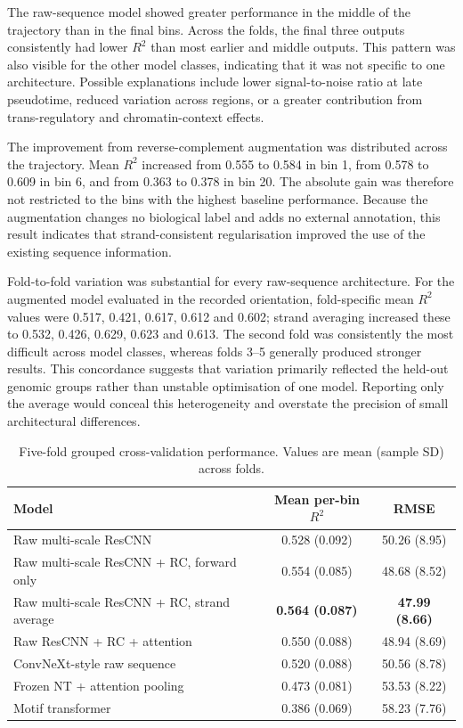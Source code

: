 \documentclass[a4paper,12pt]{article}
\begin{document}
The raw-sequence model showed greater performance in the middle of the trajectory than in the final bins. Across the folds, the final three outputs consistently had lower $R^2$ than most earlier and middle outputs. This pattern was also visible for the other model classes, indicating that it was not specific to one architecture. Possible explanations include lower signal-to-noise ratio at late pseudotime, reduced variation across regions, or a greater contribution from trans-regulatory and chromatin-context effects.

The improvement from reverse-complement augmentation was distributed across the trajectory. Mean $R^2$ increased from 0.555 to 0.584 in bin 1, from 0.578 to 0.609 in bin 6, and from 0.363 to 0.378 in bin 20. The absolute gain was therefore not restricted to the bins with the highest baseline performance. Because the augmentation changes no biological label and adds no external annotation, this result indicates that strand-consistent regularisation improved the use of the existing sequence information.

Fold-to-fold variation was substantial for every raw-sequence architecture. For the augmented model evaluated in the recorded orientation, fold-specific mean $R^2$ values were 0.517, 0.421, 0.617, 0.612 and 0.602; strand averaging increased these to 0.532, 0.426, 0.629, 0.623 and 0.613. The second fold was consistently the most difficult across model classes, whereas folds 3--5 generally produced stronger results. This concordance suggests that variation primarily reflected the held-out genomic groups rather than unstable optimisation of one model. Reporting only the average would conceal this heterogeneity and overstate the precision of small architectural differences.

\begin{table}[htb]
\centering
\caption{Five-fold grouped cross-validation performance. Values are mean (sample SD) across folds.}
\label{tab:cv}
\begin{tabular}{lcc}
\toprule
Model & Mean per-bin $R^2$ & RMSE \\
\midrule
Raw multi-scale ResCNN & 0.528 (0.092) & 50.26 (8.95) \\
Raw multi-scale ResCNN + RC, forward only & 0.554 (0.085) & 48.68 (8.52) \\
Raw multi-scale ResCNN + RC, strand average & \textbf{0.564 (0.087)} & \textbf{47.99 (8.66)} \\
Raw ResCNN + RC + attention & 0.550 (0.088) & 48.94 (8.69) \\
ConvNeXt-style raw sequence & 0.520 (0.088) & 50.56 (8.78) \\
Frozen NT + attention pooling & 0.473 (0.081) & 53.53 (8.22) \\
Motif transformer & 0.386 (0.069) & 58.23 (7.76) \\
\bottomrule
\end{tabular}
\end{table}
\end{document}
